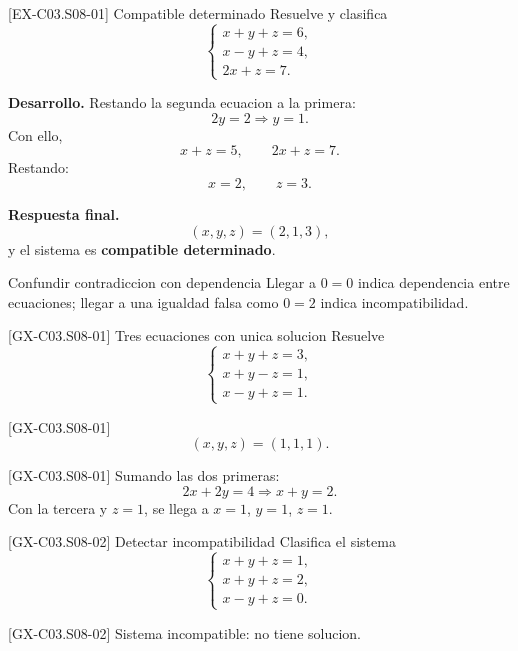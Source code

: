 \begin{solvedexample}{[EX-C03.S08-01] Compatible determinado}
Resuelve y clasifica
\[
\begin{cases}
x+y+z=6,\\
x-y+z=4,\\
2x+z=7.
\end{cases}
\]

\textbf{Desarrollo.} Restando la segunda ecuacion a la primera:
\[
2y=2 \Longrightarrow y=1.
\]
Con ello,
\[
x+z=5,\qquad 2x+z=7.
\]
Restando:
\[
x=2,\qquad z=3.
\]

\textbf{Respuesta final.}
\[
(x,y,z)=(2,1,3),
\]
y el sistema es \textbf{compatible determinado}.
\end{solvedexample}

\begin{commonerror}{Confundir contradiccion con dependencia}
Llegar a \(0=0\) indica dependencia entre ecuaciones; llegar a una igualdad falsa como \(0=2\)
indica incompatibilidad.
\end{commonerror}

\begin{guidedexercise}{[GX-C03.S08-01] Tres ecuaciones con unica solucion}
Resuelve
\[
\begin{cases}
x+y+z=3,\\
x+y-z=1,\\
x-y+z=1.
\end{cases}
\]
\end{guidedexercise}

\begin{shortanswer}{[GX-C03.S08-01]}
\[
(x,y,z)=(1,1,1).
\]
\end{shortanswer}

\begin{fullsolution}{[GX-C03.S08-01]}
Sumando las dos primeras:
\[
2x+2y=4 \Longrightarrow x+y=2.
\]
Con la tercera y \(z=1\), se llega a \(x=1\), \(y=1\), \(z=1\).
\end{fullsolution}

\begin{guidedexercise}{[GX-C03.S08-02] Detectar incompatibilidad}
Clasifica el sistema
\[
\begin{cases}
x+y+z=1,\\
x+y+z=2,\\
x-y+z=0.
\end{cases}
\]
\end{guidedexercise}

\begin{shortanswer}{[GX-C03.S08-02]}
Sistema incompatible: no tiene solucion.
\end{shortanswer}

